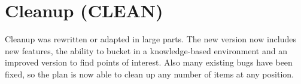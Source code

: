 \documentclass[main.tex]{subfiles}
\begin{document}
                \section{Cleanup (CLEAN)}
                Cleanup was rewritten or adapted in large parts. The new version now includes new features, the ability to bucket in a knowledge-based environment and an improved version to find points of interest. Also many existing bugs have been fixed, so the plan is now able to clean up any number of items at any position.
                

	
\end{document}

